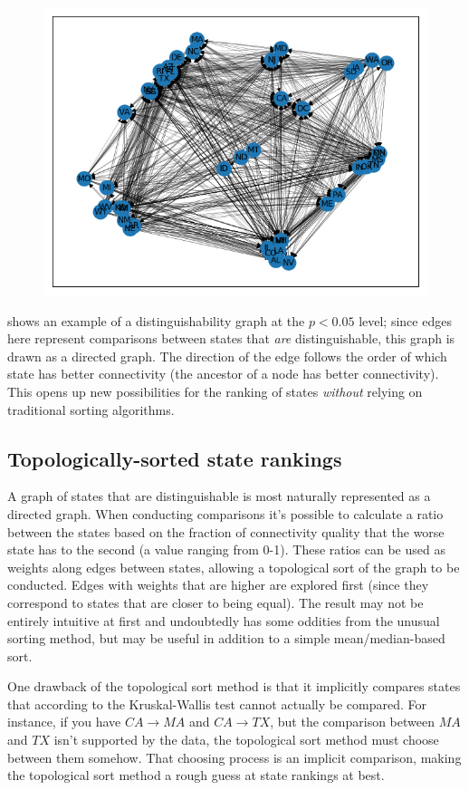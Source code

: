 \begin{figure}[h]
    \centering
    \includegraphics[width=\textwidth]{images/caida/caida_network_valid_comps.png}
\end{figure}

 shows an example of a distinguishability graph at the $p<0.05$ level; since edges here represent comparisons between states that \textit{are} distinguishable, this graph is drawn as a directed graph. The direction of the edge follows the order of which state has better connectivity (the ancestor of a node has better connectivity). This opens up new possibilities for the ranking of states \textit{without} relying on traditional sorting algorithms.

\subsection{Topologically-sorted state rankings}\label{sec:methods_stats_topological_rankings}

A graph of states that are distinguishable is most naturally represented as a directed graph. When conducting comparisons it's possible to calculate a ratio between the states based on the fraction of connectivity quality that the worse state has to the second (a value ranging from 0-1). These ratios can be used as weights along edges between states, allowing a topological sort of the graph to be conducted. Edges with weights that are higher are explored first (since they correspond to states that are closer to being equal). The result may not be entirely intuitive at first and undoubtedly has some oddities from the unusual sorting method, but may be useful in addition to a simple mean/median-based sort.

One drawback of the topological sort method is that it implicitly compares states that according to the Kruskal-Wallis test cannot actually be compared. For instance, if you have $CA\rightarrow MA$ and $CA\rightarrow TX$, but the comparison between $MA$ and $TX$ isn't supported by the data, the topological sort method must choose between them somehow. That choosing process is an implicit comparison, making the topological sort method a rough guess at state rankings at best.
